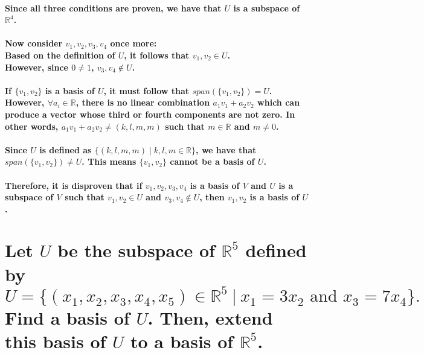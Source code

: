 \documentclass{article}
\begin{document}
\paragraph{\large
Since all three conditions are proven, we have that $U$ is a subspace of $\mathbb{R}^4$.}

\paragraph{\large
Now consider $v_1,v_2,v_3,v_4$ once more:
\\\indent Based on the definition of $U$, it follows that $v_1,v_2 \in U$. \\\indent However, since $0 \neq 1$, $v_3,v_4 \notin U$.}

\paragraph{\large
If $\{v_1,v_2\}$ is a basis of $U$, it must follow that $span(\{v_1, v_2\}) = U$. However, $\forall a_i \in \mathbb{R}$, there is no linear combination $a_{1}v_{1} + a_{2}v_{2}$ which can produce a vector whose third or fourth components are not zero. In other words, $a_{1}v_{1} + a_{2}v_{2} \neq (k,l,m,m)$ such that $m \in \mathbb{R}$ and $m \neq 0$.}

\paragraph{\large
Since $U$ is defined as $\{(k, l, m, m)\;|\;k,l,m \in \mathbb{R}\}$, we have that $span(\{v_1, v_2\}) \neq U$. This means $\{v_1,v_2\}$ cannot be a basis of $U$.}

\paragraph{\large
Therefore, it is disproven that if $v_1,v_2,v_3,v_4$ is a basis of $V$ and $U$ is a subspace of $V$ such that $v_1, v_2 \in U$ and $v_3,v_4 \not \in U$, then $v_1,v_2$ is a basis of $U$.}

\newpage

\section{Let $U$ be the subspace of $\mathbb{R}^5$ defined by
$$
U = \{(x_1,x_2,x_3,x_4,x_5)\in \mathbb{R}^5\ |\ x_1=3x_2\text{ and } x_3=7x_4\}.
$$
Find a basis of $U$. Then, extend this basis of $U$ to a basis of $\mathbb{R}^5$.}
\end{document}
